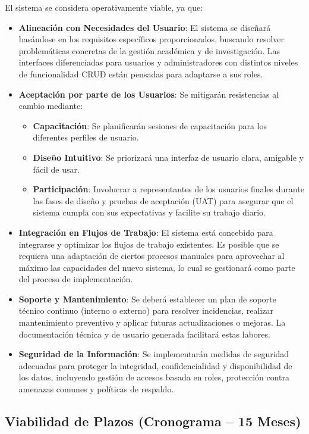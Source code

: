 El sistema se considera operativamente viable, ya que:
\begin{itemize}
    \item \textbf{Alineación con Necesidades del Usuario}: El sistema se diseñará basándose en los requisitos específicos proporcionados, buscando resolver problemáticas concretas de la gestión académica y de investigación. Las interfaces diferenciadas para usuarios y administradores con distintos niveles de funcionalidad CRUD están pensadas para adaptarse a sus roles.
\item \textbf{Aceptación por parte de los Usuarios}: Se mitigarán resistencias al cambio mediante:
\begin{itemize}
\item \textbf{Capacitación}: Se planificarán sesiones de capacitación para los diferentes perfiles de usuario.
\item \textbf{Diseño Intuitivo}: Se priorizará una interfaz de usuario clara, amigable y fácil de usar.
\item \textbf{Participación}: Involucrar a representantes de los usuarios finales durante las fases de diseño y pruebas de aceptación (UAT) para asegurar que el sistema cumpla con sus expectativas y facilite su trabajo diario.
\end{itemize}
\item \textbf{Integración en Flujos de Trabajo}: El sistema está concebido para integrarse y optimizar los flujos de trabajo existentes. Es posible que se requiera una adaptación de ciertos procesos manuales para aprovechar al máximo las capacidades del nuevo sistema, lo cual se gestionará como parte del proceso de implementación.
\item \textbf{Soporte y Mantenimiento}: Se deberá establecer un plan de soporte técnico continuo (interno o externo) para resolver incidencias, realizar mantenimiento preventivo y aplicar futuras actualizaciones o mejoras. La documentación técnica y de usuario generada facilitará estas labores.
\item \textbf{Seguridad de la Información}: Se implementarán medidas de seguridad adecuadas para proteger la integridad, confidencialidad y disponibilidad de los datos, incluyendo gestión de accesos basada en roles, protección contra amenazas comunes y políticas de respaldo.
\end{itemize}


\subsection{Viabilidad de Plazos (Cronograma – 15 Meses)}

